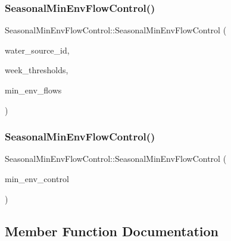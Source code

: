 \subsubsection{\texorpdfstring{Seasonal\+Min\+Env\+Flow\+Control()}{SeasonalMinEnvFlowControl()}\hspace{0.1cm}{\footnotesize\ttfamily [1/2]}}
{\footnotesize\ttfamily Seasonal\+Min\+Env\+Flow\+Control\+::\+Seasonal\+Min\+Env\+Flow\+Control (\begin{DoxyParamCaption}\item[{int}]{water\+\_\+source\+\_\+id,  }\item[{const vector$<$ int $>$ \&}]{week\+\_\+thresholds,  }\item[{const vector$<$ double $>$ \&}]{min\+\_\+env\+\_\+flows }\end{DoxyParamCaption})}

\mbox{\label{classSeasonalMinEnvFlowControl_ad0eeb570fc096a92b788b5c4a48bcec4}} 
\subsubsection{\texorpdfstring{Seasonal\+Min\+Env\+Flow\+Control()}{SeasonalMinEnvFlowControl()}\hspace{0.1cm}{\footnotesize\ttfamily [2/2]}}
{\footnotesize\ttfamily Seasonal\+Min\+Env\+Flow\+Control\+::\+Seasonal\+Min\+Env\+Flow\+Control (\begin{DoxyParamCaption}\item[{const \mbox{\hyperlink{classSeasonalMinEnvFlowControl}{Seasonal\+Min\+Env\+Flow\+Control}} \&}]{min\+\_\+env\+\_\+control }\end{DoxyParamCaption})}



\subsection{Member Function Documentation}
\mbox{\label{classSeasonalMinEnvFlowControl_a5c5ddcab367812bdd2e23b383449d202}} 
